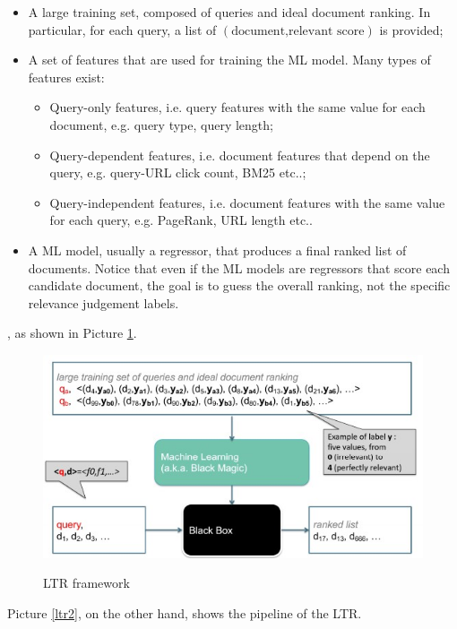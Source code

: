 \begin{itemize}
    \item A large training set, composed of queries and ideal document ranking. In particular, for each query, a list of $(\text{document,relevant score})$ is provided;

    \item A set of features that are used for training the ML model. Many types of features exist:

    \begin{itemize}
        \item Query-only features, i.e. query features with the same value for each document, e.g. query type, query length;
        \item Query-dependent features, i.e. document features that depend on the query, e.g. query-URL click count, BM25 etc..;
        \item Query-independent features, i.e. document features with the same value for each query, e.g. PageRank, URL length etc..
    \end{itemize}

    \item A ML model, usually a regressor, that produces a final ranked list of documents. Notice that even if the ML models are regressors that score each candidate document, the goal is to guess the overall ranking, not the specific relevance judgement labels.
\end{itemize}

, as shown in Picture \ref{ltr1}.

\begin{figure}[h!]
		\centering
        \includegraphics[scale = 1.8]{img/ltr1.jpg}
		\label{ltr1}
        \caption{LTR framework}
\end{figure}

Picture \ref{ltr2}, on the other hand, shows the pipeline of the LTR.

